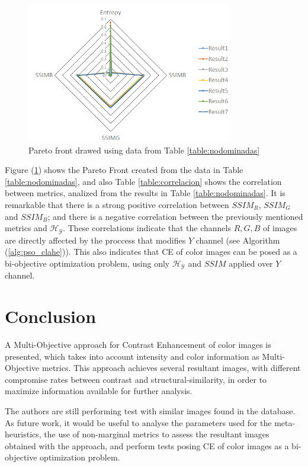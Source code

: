 \documentclass[11pt]{article}
\begin{document}
\begin{figure}[H]
    \centering
        \includegraphics[width=0.80\textwidth]{pareto_front.png}
    \caption{Pareto front drawed using data from Table \ref{table:nodominadas} }\label{fig:pareto_front}
\end{figure}



Figure (\ref{fig:pareto_front}) shows the Pareto Front created from the data in Table \ref{table:nodominadas}, and also Table \ref{table:correlacion} shows the correlation between metrics, analized from the results in Table \ref{table:nodominadas}. It is remarkable that there is a strong positive correlation between $SSIM_R$, $SSIM_G$ and $SSIM_B$; and there is a negative correlation between the previously mentioned metrics and $\mathscr{H_Y}$. These correlations indicate that the channels $R,G,B$ of images are directly affected by the proccess that modifies $Y$ channel (see Algorithm (\ref{alg:pso_clahe})). This also indicates that CE of color images can be posed as a bi-objective optimization problem, using only $\mathscr{H_Y}$ and $SSIM$ applied over $Y$ channel.

\section{Conclusion}\label{sec:conclusion}

A Multi-Objective approach for Contrast Enhancement of color images is presented, which takes into account intensity and color information as Multi-Objective metrics. This approach achieves several resultant images, with different compromise rates between contrast and structural-similarity, in order to maximize information available for further analysis.

The authors are still performing test with similar images found in the database. As future work, it would be useful to analyse the parameters used for the meta-heuristics, the use of non-marginal metrics to assess the resultant images obtained with the approach, and perform tests posing CE of color images as a bi-objective optimization problem. 



\end{document}
